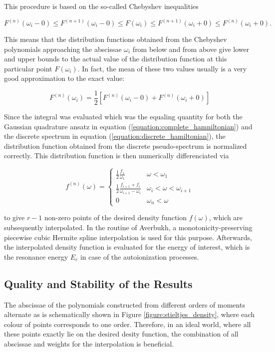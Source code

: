 This procedure is based on the so-called Chebyshev inequalities

\begin{equation} \label{equation:Chebyshev_inequalities}
  F^{(n)}(\omega_i - 0) \le F^{(n+1)}(\omega_i - 0) \le F(\omega_i)
  \le F^{(n+1)}(\omega_i + 0) \le F^{(n)}(\omega_i + 0).
\end{equation}

This means that the distribution functions obtained from the Chebyshev
polynomials approaching the abscissae $\omega_i$ from below and from above
give lower and upper bounds to the actual value of the distribution
function at this particular point $F(\omega_i)$. In fact, the mean of these
two values usually is a very good approximation to the exact value:

\begin{equation}
  F^{(n)} (\omega_i) = \frac 12 \left[ F^{(n)} (\omega_i - 0)
                       + F^{(n)} (\omega_i+0) \right]
\end{equation}

Since the integral was evaluated
which was the equaling quantity for both the Gaussian quadrature ansatz
in equation (\ref{equation:complete_hamniltonian}) and the discrete spectrum in equation
(\ref{equation:discrete_hamiltonian}), the distribution function obtained from the
discrete pseudo-spectrum is normalized correctly.
This distribution function is then numerically differenciated via

\begin{equation}
  f^{(n)} (\omega) =
  \begin{cases}
    \frac 12 \frac{f_1}{\omega_1}    & \omega < \omega_1\\
    \frac 12 \frac{f_{i+1} + f_i}{\omega_{i+1} - \omega_i}
                                     & \omega_i < \omega < \omega_{i+1}\\
    0                                & \omega_n < \omega
  \end{cases}
\end{equation}

to give  $r-1$ non-zero points of the desired
density function $f(\omega)$, which are
subsequently interpolated. In the routine of Averbukh, a 
monotonicity-preserving piecewise cubic Hermite spline interpolation
is used for this purpose. Afterwards, the interpolated density function is evaluated
for the energy of interest, which is the resonance energy $E_r$ in case of the
autoionization processes.

\subsection{Quality and Stability of the Results} \label{section:quality_stieltjes}
The abscissae of the polynomials constructed from different orders
of moments alternate as is schematically shown in
Figure \ref{figure:stieltjes_density}, where each colour of points corresponds
to one order. Therefore, in an ideal world, where all these points exactly lie
on the desired desity function, the combination of all abscissae
and weights for the interpolation is beneficial.

